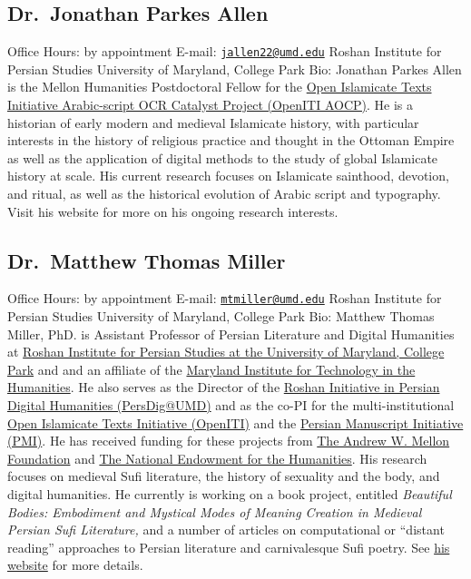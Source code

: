 \documentclass[
]{book}
\begin{document}
\hypertarget{dr.-jonathan-parkes-allen}{%
\subsection{Dr.~Jonathan Parkes Allen}\label{dr.-jonathan-parkes-allen}}

Office Hours: by appointment
E-mail: \href{mailto:jallen22@umd.edu}{\nolinkurl{jallen22@umd.edu}}
Roshan Institute for Persian Studies
University of Maryland, College Park
Bio: Jonathan Parkes Allen is the Mellon Humanities Postdoctoral Fellow for the \href{https://medium.com/@openiti/openiti-aocp-9802865a6586}{Open Islamicate Texts Initiative Arabic-script OCR Catalyst Project (OpenITI AOCP)}. He is a historian of early modern and medieval Islamicate history, with particular interests in the history of religious practice and thought in the Ottoman Empire as well as the application of digital methods to the study of global Islamicate history at scale. His current research focuses on Islamicate sainthood, devotion, and ritual, as well as the historical evolution of Arabic script and typography. Visit his website for more on his ongoing research interests.

\hypertarget{dr.-matthew-thomas-miller}{%
\subsection{Dr.~Matthew Thomas Miller}\label{dr.-matthew-thomas-miller}}

Office Hours: by appointment
E-mail: \href{mailto:mtmiller@umd.edu}{\nolinkurl{mtmiller@umd.edu}}
Roshan Institute for Persian Studies
University of Maryland, College Park
Bio: Matthew Thomas Miller, PhD. is Assistant Professor of Persian Literature and Digital Humanities at \href{http://sllc.umd.edu/persian}{Roshan Institute for Persian Studies at the University of Maryland, College Park} and and an affiliate of the \href{https://mith.umd.edu/people/}{Maryland Institute for Technology in the Humanities}. He also serves as the Director of the \href{http://persdig.umd.edu/}{Roshan Initiative in Persian Digital Humanities (PersDig@UMD)} and as the co-PI for the multi-institutional \href{https://www.openiti.org/}{Open Islamicate Texts Initiative (OpenITI)} and the \href{http://www.persianmanuscript.org/}{Persian Manuscript Initiative (PMI)}. He has received funding for these projects from \href{https://mellon.org/}{The Andrew W. Mellon Foundation} and \href{https://www.neh.gov/}{The National Endowment for the Humanities}. His research focuses on medieval Sufi literature, the history of sexuality and the body, and digital humanities. He currently is working on a book project, entitled \emph{Beautiful Bodies: Embodiment and Mystical Modes of Meaning Creation in Medieval Persian Sufi Literature,} and a number of articles on computational or ``distant reading'' approaches to Persian literature and carnivalesque Sufi poetry. See \href{https://matthewthomasmiller.github.io/}{his website} for more details.
\end{document}
